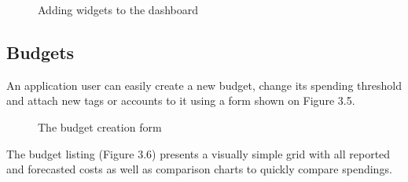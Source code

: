 \documentclass[licencjacka,en]{thesisclass}
\begin{document}
    \begin{figure}[!htbp]
      \caption{Adding widgets to the dashboard\label{fig:scr-dashboard-add}}
    \end{figure}
    
    
    \subsection{Budgets}
    
    An application user can easily create a new budget,
    change its spending threshold and attach new tags or accounts to it
    using a form shown on Figure 3.5.
    
    \begin{figure}[!htbp]
      \caption{The budget creation form\label{fig:scr-budget-create}}
    \end{figure}
    
    The budget listing (Figure 3.6) presents a visually simple grid with all reported and forecasted
    costs as well as comparison charts to quickly compare spendings.
    
\end{document}
